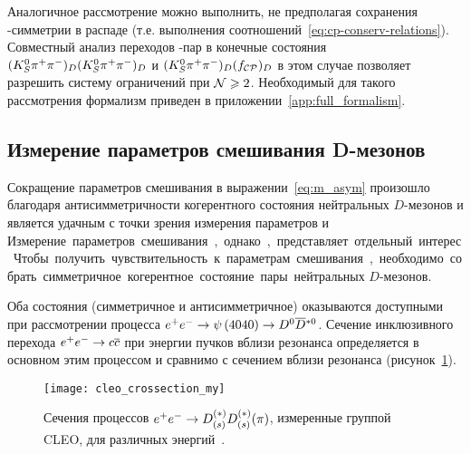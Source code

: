 Аналогичное рассмотрение можно выполнить, не предполагая сохранения \cpconj-симметрии в распаде \dnkpp (т.е. выполнения соотношений~\eqref{eq:cp-conserv-relations}).  Совместный анализ переходов \ddbar-пар в конечные состояния $(K_S^0\pi^+\pi^-)_D(K_S^0\pi^+\pi^-)_D$ и $(K_S^0\pi^+\pi^-)_D(f_{\mathcal{CP}})_D$ в этом случае позволяет разрешить систему ограничений при $\mathcal{N}\geqslant 2$.  Необходимый для такого рассмотрения формализм приведен в приложении~\ref{app:full_formalism}.

\subsection{Измерение параметров смешивания D-мезонов}\label{sec:charm_mixing_measurement_at_ctau}
Сокращение параметров смешивания в выражении~\eqref{eq:m_asym} произошло благодаря антисимметричности когерентного состояния нейтральных $D$-мезонов и является удачным с точки зрения измерения параметров \ci и \si.  Измерение параметров смешивания, однако, представляет отдельный интерес.  Чтобы получить чувствительность к параметрам смешивания, необходимо собрать симметричное когерентное состояние пары нейтральных $D$-мезонов.  

Оба состояния (симметричное и антисимметричное) оказываются доступными при рассмотрении процесса $e^+e^-\to\psi\left(4040\right)\to D^0\overline{D}{}^{*0}$.  Сечение инклюзивного перехода $e^+e^-\to c\overline{c}$ при энергии пучков вблизи резонанса \pppsi определяется в основном этим процессом и сравнимо с сечением вблизи резонанса \ppsi (рисунок~\ref{fig:cleo_crossection}).

\begin{figure}[htb]
 \centering
  \texttt{[image: cleo\_crossection\_my]}
 \caption{Сечения процессов $e^+e^-\to D_{(s)}^{(*)}D_{(s)}^{(*)}(\pi)$, измеренные группой CLEO, для различных энергий~\cite{cleo_charm_crossection}.}
 \label{fig:cleo_crossection}
\end{figure}


